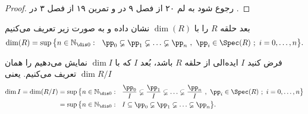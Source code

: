 \begin{proof}
رجوع شود به لم ۲۰ از فصل ۹ در
\cite{sharp}
و تمرین ۱۹ از فصل ۳ در
\cite{atiyah}.
\end{proof}
\begin{definition}
بعد حلقه $R$ را با $\dim(R)$ نشان داده و به صورت زیر تعریف می‌کنیم
$$ \dim(R)=\sup\big\{n\in\Bbb N_{\dis 0}:~~ {{\pp}}_0 \varsubsetneq {{\pp}}_1 \varsubsetneq \ldots\varsubsetneq {{\pp}}_n ~, ~ {\pp}_i \in \Spec(R)~ ;~ i=0,\ldots,n\big\}.$$
\end{definition}
\begin{definition}\label{dimR/I}
فرض کنید $I$ ایده‌الی از حلقه $R$ باشد، بُعد $I$ که با $\dim I$ نمایش می‌دهیم را همان $\dim R/I$ تعریف می‌کنیم. یعنی
\begin{align*}
\dim I=\dim (R/I) &=\sup\big\{n\in\Bbb N_{\dis 0}:~~\frac{{\pp}_0}{I }\varsubsetneq \frac{{\pp}_1}{I} \varsubsetneq \ldots\varsubsetneq\frac{{\pp}_n}{I} ~,~ {\pp}_i \in \Spec(R)~ ;~ i=0,\ldots,n\big\}\\
&=\sup\big\{n\in\Bbb N_{\dis 0}:~~I\subseteq {\pp}_0 \varsubsetneq {\pp}_1 \varsubsetneq \ldots\varsubsetneq {\pp}_n\big \}.
\end{align*}
\end{definition}
